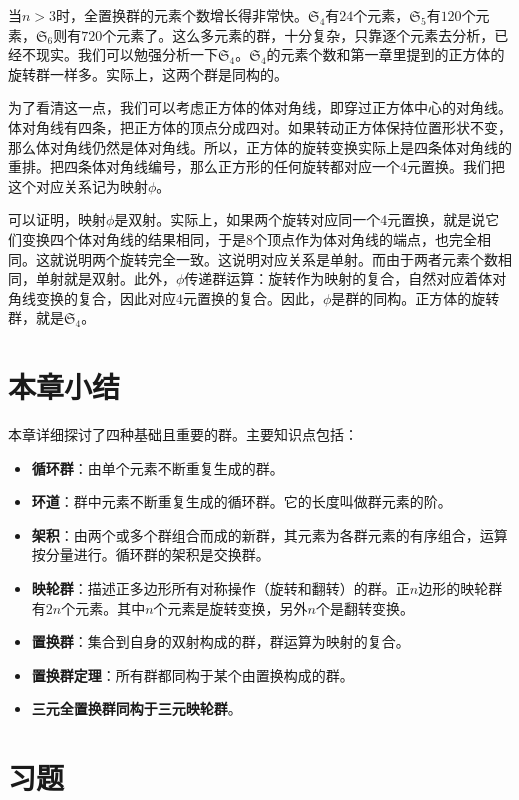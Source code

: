 \documentclass[12pt,UTF8,fontset=none]{ctexbook}
\begin{document}
当$n>3$时，全置换群的元素个数增长得非常快。$\mathfrak{S}_4$有$24$个元素，$\mathfrak{S}_5$有$120$个元素，$\mathfrak{S}_6$则有$720$个元素了。这么多元素的群，十分复杂，只靠逐个元素去分析，已经不现实。我们可以勉强分析一下$\mathfrak{S}_4$。$\mathfrak{S}_4$的元素个数和第一章里提到的正方体的旋转群一样多。实际上，这两个群是同构的。

为了看清这一点，我们可以考虑正方体的体对角线，即穿过正方体中心的对角线。体对角线有四条，把正方体的顶点分成四对。如果转动正方体保持位置形状不变，那么体对角线仍然是体对角线。所以，正方体的旋转变换实际上是四条体对角线的重排。把四条体对角线编号，那么正方形的任何旋转都对应一个$4$元置换。我们把这个对应关系记为映射$\phi$。

可以证明，映射$\phi$是双射。实际上，如果两个旋转对应同一个$4$元置换，就是说它们变换四个体对角线的结果相同，于是$8$个顶点作为体对角线的端点，也完全相同。这就说明两个旋转完全一致。这说明对应关系是单射。而由于两者元素个数相同，单射就是双射。此外，$\phi$传递群运算：旋转作为映射的复合，自然对应着体对角线变换的复合，因此对应$4$元置换的复合。因此，$\phi$是群的同构。正方体的旋转群，就是$\mathfrak{S}_4$。

\clearpage
\section*{本章小结}

本章详细探讨了四种基础且重要的群。主要知识点包括：
\begin{itemize}
    \item \textbf{循环群}：由单个元素不断重复生成的群。
    \item \textbf{环道}：群中元素不断重复生成的循环群。它的长度叫做群元素的阶。
    \item \textbf{架积}：由两个或多个群组合而成的新群，其元素为各群元素的有序组合，运算按分量进行。循环群的架积是交换群。
    \item \textbf{映轮群}：描述正多边形所有对称操作（旋转和翻转）的群。正$n$边形的映轮群有$2n$个元素。其中$n$个元素是旋转变换，另外$n$个是翻转变换。
    \item \textbf{置换群}：集合到自身的双射构成的群，群运算为映射的复合。
    \item \textbf{置换群定理}：所有群都同构于某个由置换构成的群。
    \item \textbf{三元全置换群同构于三元映轮群}。
\end{itemize}

\clearpage
\section{习题}  %
\end{document}
